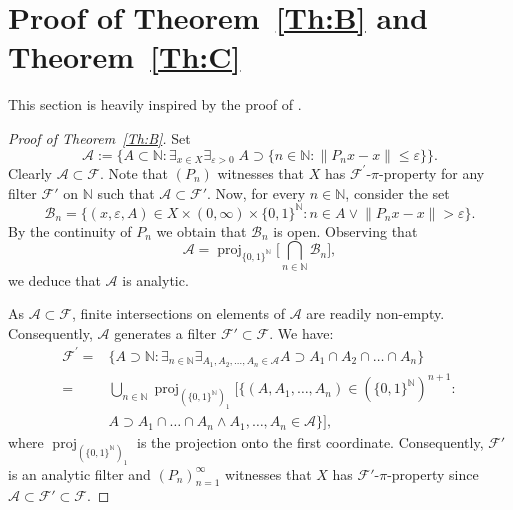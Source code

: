 \documentclass[12pt,fleqn]{amsart}
\newcommand{\N}{\mathbb{N}}
\newcommand{\IN}{\mathbb{N}}
\newcommand{\FF}{\mathscr{F}}
\renewcommand{\leq}{\leqslant}
\newcommand{\mc}{\mathcal}
\newcommand{\on}{\operatorname}
\theoremstyle{definition}
\theoremstyle{remark}
\begin{document}
\section{Proof of Theorem~\ref{Th:B} and Theorem~\ref{Th:C}}
This section is heavily inspired by the proof of \cite[Theorem B]{RKS}.
\begin{proof}[Proof of Theorem~\ref{Th:B}]
Set 
\[
    \mc{A}:= \Bigg\{A \subset \IN\colon \exists_{x \in X} \exists_{\varepsilon>0}\; A \supset \Big\{ n \in \IN\colon \big\|P_nx - x \big\| \leq \varepsilon \Big\}\Bigg\}.
\]
Clearly $\mc{A} \subset \FF$. Note that $(P_n)$ witnesses that $X$ has $\FF^\prime$-$\pi$-property for any filter $\FF'$ on $\IN$ such that $\mc{A} \subset \FF' $. Now, for every $n \in \N$, consider the set
\[
\mc{B}_n= \Big\{ (x,\varepsilon,A)\in X \times (0,\infty)\times \{0, 1\}^\IN\colon n \in A \vee \big\|P_nx - x \big\| > \varepsilon \Big\}.
\]
By the continuity of $P_n$ we obtain that $\mc{B}_n$ is open. Observing that
\[
\mc{A} = \on{proj}_{\{0, 1\}^\IN}\Big[\bigcap_{n \in \IN} \mc{B}_n\Big],
\]
we deduce that $\mc{A}$ is analytic.\smallskip

As $\mc{A} \subset \FF$, finite intersections on elements of $\mc{A}$ are readily non-empty. Consequently, $\mc{A}$ generates a filter $\FF' \subset \FF$. We have:
\[
    \begin{aligned}
    \FF^\prime= &\{A \supset \IN\colon \exists_{n \in \IN} \exists_{A_1, A_2, \ldots, A_n \in \mc{A}} A \supset A_1 \cap A_2 \cap \ldots \cap A_n \} \\
    = & \bigcup_{n \in \IN} \on{proj}_{(\{0, 1\}^\N)_1} [\{ (A, A_1, \ldots, A_n)\in (\{0, 1\}^\N)^{n+1}\colon \\
    & A \supset A_1 \cap \ldots \cap A_n \wedge A_1, \ldots, A_n \in \mc{A}\}],
\end{aligned}
\]
where $\on{proj}_{(\{0, 1\}^\N)_1}$ is the projection onto the first coordinate. Consequently, $\FF'$ is an analytic filter and $(P_n)_{n=1}^\infty$ witnesses that $X$ has $\FF'$-$\pi$-property since $\mc{A}\subset \FF' \subset \FF$.
\end{proof}
\end{document}
